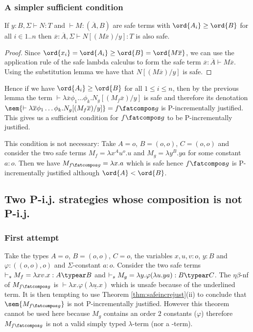 \subsubsection{A simpler sufficient condition}
\begin{lemma}
If $y:B, \Sigma \vdash N : T$ and $\vdash M : (\overline{A}, B)$
are safe terms with $\ord{A_i} \geq \ord{B}$ for all $i\in 1..n$
then $\overline{x}:\overline{A}, \Sigma \vdash N[(M \overline{x})/y] :T$ is also safe.
\end{lemma}
\begin{proof}
Since $\ord{x_i} = \ord{A_i} \geq \ord{B} = \ord{M \overline{x}}$, we can use the application
rule of the safe lambda calculus to form the safe term $\overline{x}:\overline{A} \vdash M \overline{x}$.
Using the substitution lemma we have that $N[(M \overline{x})/y]$ is safe.
\end{proof}

Hence if we have $\ord{A_i}\geq\ord{B}$
for all $1 \leq i \leq n$,
then by the previous lemma the term $\vdash \lambda \overline{x} \phi_1 \dots \phi_k. N_g [(M_f \overline{x}) / y]$
is safe and therefore its denotation $\sem{\vdash \lambda \overline{x} \phi_1 \dots \phi_k. N_g [(M_f \overline{x}) / y]} = f\fatcompos g$ is P-incrementally justified.
This gives us a sufficient condition for $f\fatcompos g$ to be P-incrementally justified.

This condition is not necessary: Take $A=o$, $B=(o,o)$, $C=(o,o)$ and consider the two safe terms $M_f = \lambda x^A u^o.u$ and $M_g = \lambda y^B . y a$ for  some constant $a:o$. Then we have $M_{f\fatcompos g} = \lambda x . a$ which is safe hence $f\fatcompos g$ is P-incrementally justified although $\ord{A} < \ord{B}$.





\subsection{Two P-i.j. strategies whose composition is not P-i.j.}
\subsubsection{First attempt}

Take the types $A=o$, $B=(o,o)$, $C=o$, the variables
$x,u,v:o$, $y:B$ and $\varphi:((o,o),o)$ and $\Sigma$-constant $a:o$.
Consider the two safe terms $\vdash_s  M_f = \lambda xv.x : A\typear B$ and $\vdash_s M_g = \lambda y . \varphi (\lambda u . y a) : B\typear C$.
The $\eta\beta$-nf of $M_{f\fatcompos g}$ is $\vdash \lambda x . \varphi (\underline{\lambda u . x})$ which is unsafe because of the underlined term. It is then tempting to use
Theorem \ref{thm:safeincrejust}(ii) to conclude that
$\sem{M_{f\fatcompos g}}$ is not P-incrementally justified. However this theorem cannot be used here because $M_g$ contains an order $2$ constants ($\varphi$) therefore
$M_{f\fatcompos g}$ is not a valid simply typed $\lambda$-term (nor a \pcf-term).

